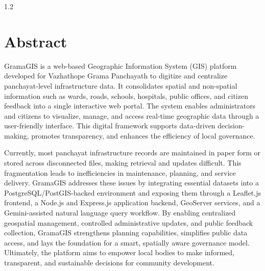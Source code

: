 ﻿\newpage
{}
\thispagestyle{empty}
%
\begin{spacing}{1.2}
%
\chapter*{Abstract}

GramaGIS is a web-based Geographic Information System (GIS) platform developed for Vazhathope Grama Panchayath to digitize and centralize panchayat-level infrastructure data. It consolidates spatial and non-spatial information such as wards, roads, schools, hospitals, public offices, and citizen feedback into a single interactive web portal. The system enables administrators and citizens to visualize, manage, and access real-time geographic data through a user-friendly interface. This digital framework supports data-driven decision-making, promotes transparency, and enhances the efficiency of local governance.

Currently, most panchayat infrastructure records are maintained in paper form or stored across disconnected files, making retrieval and updates difficult. This fragmentation leads to inefficiencies in maintenance, planning, and service delivery. GramaGIS addresses these issues by integrating essential datasets into a PostgreSQL/PostGIS-backed environment and exposing them through a Leaflet.js frontend, a Node.js and Express.js application backend, GeoServer services, and a Gemini-assisted natural language query workflow. By enabling centralized geospatial management, controlled administrative updates, and public feedback collection, GramaGIS strengthens planning capabilities, simplifies public data access, and lays the foundation for a smart, spatially aware governance model. Ultimately, the platform aims to empower local bodies to make informed, transparent, and sustainable decisions for community development.

\end{spacing}
